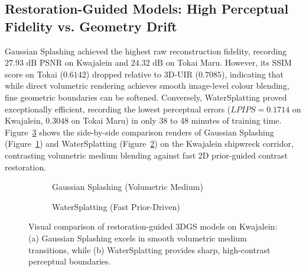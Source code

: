 \subsection{Restoration-Guided Models: High Perceptual Fidelity vs. Geometry Drift}
Gaussian Splashing achieved the highest raw reconstruction fidelity, recording $27.93\text{ dB}$ PSNR on Kwajalein and $24.32\text{ dB}$ on Tokai Maru. However, its SSIM score on Tokai ($0.6142$) dropped relative to 3D-UIR ($0.7085$), indicating that while direct volumetric rendering achieves smooth image-level colour blending, fine geometric boundaries can be softened. Conversely, WaterSplatting proved exceptionally efficient, recording the lowest perceptual errors ($LPIPS = 0.1714$ on Kwajalein, $0.3048$ on Tokai Maru) in only 38 to 48 minutes of training time. Figure~\ref{fig:restoration_models} shows the side-by-side comparison renders of Gaussian Splashing (Figure~\ref{fig:gs_splashing}) and WaterSplatting (Figure~\ref{fig:watersplatting}) on the Kwajalein shipwreck corridor, contrasting volumetric medium blending against fast 2D prior-guided contrast restoration.

\begin{figure}[htbp]
    \centering
    \begin{subfigure}[b]{0.48\textwidth}
        \centering
        \caption{Gaussian Splashing (Volumetric Medium)}
        \label{fig:gs_splashing}
    \end{subfigure}
    \hfill
    \begin{subfigure}[b]{0.48\textwidth}
        \centering
        \caption{WaterSplatting (Fast Prior-Driven)}
        \label{fig:watersplatting}
    \end{subfigure}
    \caption{Visual comparison of restoration-guided 3DGS models on Kwajalein: (a) Gaussian Splashing excels in smooth volumetric medium transitions, while (b) WaterSplatting provides sharp, high-contrast perceptual boundaries.}
    \label{fig:restoration_models}
\end{figure}

